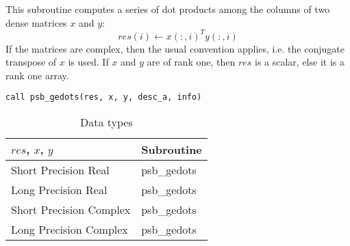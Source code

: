 This subroutine computes a series of  dot products among the columns of
two dense matrices  $x$ and $y$: 
\[ res(i) \leftarrow x(:,i)^T y(:,i)\]
If the matrices are complex, then the
usual convention applies, i.e. the conjugate transpose of $x$ is
used. If $x$ and $y$ are of rank one, then $res$ is a scalar, else it
is a rank one array. 

\begin{verbatim}
call psb_gedots(res, x, y, desc_a, info)
\end{verbatim}
\begin{table}[h]
\begin{center}
\begin{tabular}{ll}
\hline
$res$, $x$, $y$ & {\bf Subroutine}\\
\hline
Short Precision Real & psb\_gedots \\
Long Precision Real & psb\_gedots \\
Short Precision Complex & psb\_gedots \\	
Long Precision Complex & psb\_gedots \\	
\hline
\end{tabular}
\end{center}
\caption{Data types\label{tab:f90mdot}}
\end{table}


